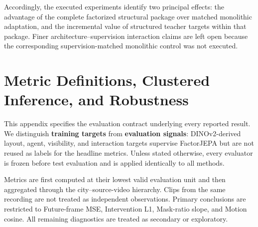 Accordingly, the executed experiments identify two principal effects:
the advantage of the complete factorized structural package over
matched monolithic adaptation, and the incremental value of structured
teacher targets within that package. Finer architecture--supervision
interaction claims are left open because the corresponding
supervision-matched monolithic control was not executed.




















































\section{Metric Definitions, Clustered Inference, and Robustness}
\label{app:metrics_statistics}

This appendix specifies the evaluation contract underlying every
reported result. We distinguish \textbf{training targets} from
\textbf{evaluation signals}: DINOv2-derived layout, agent, visibility,
and interaction targets supervise FactorJEPA but are not reused as
labels for the headline metrics. Unless stated otherwise, every
evaluator is frozen before test evaluation and is applied identically
to all methods.

Metrics are first computed at their lowest valid evaluation unit and
then aggregated through the city--source-video hierarchy. Clips from
the same recording are not treated as independent observations.
Primary conclusions are restricted to Future-frame MSE, Intervention
L1, Mask-ratio slope, and Motion cosine. All remaining diagnostics are
treated as secondary or exploratory.


